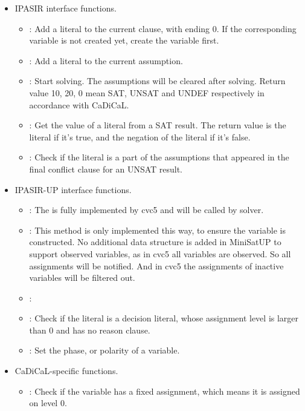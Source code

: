 \begin{itemize}
  \item IPASIR interface functions.
  \begin{itemize}
    \item {}: Add a literal to the current clause, with ending 0. If the corresponding variable is not created yet, create the variable first.
    \item {}: Add a literal to the current assumption.
    \item {}: Start solving. The assumptions will be cleared after solving. Return value 10, 20, 0 mean SAT, UNSAT and UNDEF respectively in accordance with CaDiCaL.
    \item {}: Get the value of a literal from a SAT result. The return value is the literal if it's true, and the negation of the literal if it's false.
    \item {}: Check if the literal is a part of the assumptions that appeared in the final conflict clause for an UNSAT result.
  \end{itemize}
  \item IPASIR-UP interface functions.
  \begin{itemize}
    \item {}: The  is fully implemented by cvc5 and will be called by solver.
    \item {}: This method is only implemented this way, to ensure the variable is constructed. No additional data structure is added in MiniSatUP to support observed variables, as in cvc5 all variables are observed. So all assignments will be notified. And in cvc5 the assignments of inactive variables will be filtered out.
    \item {}:
    \item {}: Check if the literal is a decision literal, whose assignment level is larger than 0 and has no reason clause.
    \item {}: Set the phase, or polarity of a variable.
  \end{itemize}
  \item CaDiCaL-specific functions.
  \begin{itemize}
    \item {}: Check if the variable has a fixed assignment, which means it is assigned on level 0.

\end{itemize}
\end{itemize}
